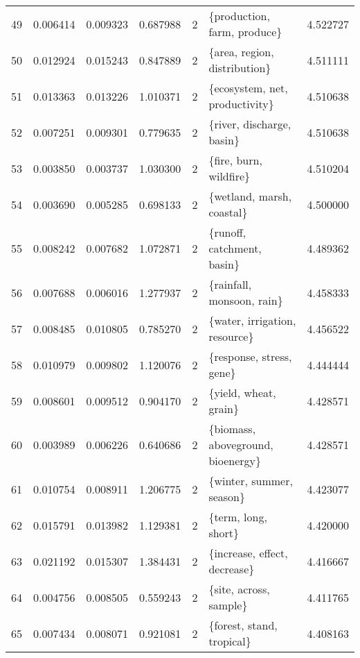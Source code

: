 \begin{tabular}{lrrrrlr}
49  &    0.006414 &  0.009323 &        0.687988 &           2 &             \{production, farm, produce\} &  4.522727 \\
50  &    0.012924 &  0.015243 &        0.847889 &           2 &            \{area, region, distribution\} &  4.511111 \\
51  &    0.013363 &  0.013226 &        1.010371 &           2 &          \{ecosystem, net, productivity\} &  4.510638 \\
52  &    0.007251 &  0.009301 &        0.779635 &           2 &               \{river, discharge, basin\} &  4.510638 \\
53  &    0.003850 &  0.003737 &        1.030300 &           2 &                  \{fire, burn, wildfire\} &  4.510204 \\
54  &    0.003690 &  0.005285 &        0.698133 &           2 &               \{wetland, marsh, coastal\} &  4.500000 \\
55  &    0.008242 &  0.007682 &        1.072871 &           2 &              \{runoff, catchment, basin\} &  4.489362 \\
56  &    0.007688 &  0.006016 &        1.277937 &           2 &               \{rainfall, monsoon, rain\} &  4.458333 \\
57  &    0.008485 &  0.010805 &        0.785270 &           2 &           \{water, irrigation, resource\} &  4.456522 \\
58  &    0.010979 &  0.009802 &        1.120076 &           2 &                \{response, stress, gene\} &  4.444444 \\
59  &    0.008601 &  0.009512 &        0.904170 &           2 &                   \{yield, wheat, grain\} &  4.428571 \\
60  &    0.003989 &  0.006226 &        0.640686 &           2 &       \{biomass, aboveground, bioenergy\} &  4.428571 \\
61  &    0.010754 &  0.008911 &        1.206775 &           2 &                \{winter, summer, season\} &  4.423077 \\
62  &    0.015791 &  0.013982 &        1.129381 &           2 &                     \{term, long, short\} &  4.420000 \\
63  &    0.021192 &  0.015307 &        1.384431 &           2 &            \{increase, effect, decrease\} &  4.416667 \\
64  &    0.004756 &  0.008505 &        0.559243 &           2 &                  \{site, across, sample\} &  4.411765 \\
65  &    0.007434 &  0.008071 &        0.921081 &           2 &               \{forest, stand, tropical\} &  4.408163 \\

\end{tabular}
